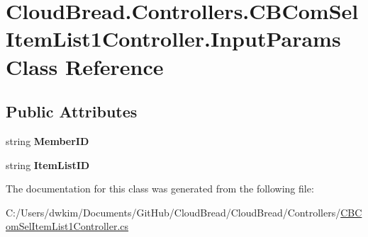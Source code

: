 \hypertarget{class_cloud_bread_1_1_controllers_1_1_c_b_com_sel_item_list1_controller_1_1_input_params}{}\section{Cloud\+Bread.\+Controllers.\+C\+B\+Com\+Sel\+Item\+List1\+Controller.\+Input\+Params Class Reference}
\label{class_cloud_bread_1_1_controllers_1_1_c_b_com_sel_item_list1_controller_1_1_input_params}
\subsection*{Public Attributes}
\begin{DoxyCompactItemize}
\item 
string {\bfseries Member\+ID}\hypertarget{class_cloud_bread_1_1_controllers_1_1_c_b_com_sel_item_list1_controller_1_1_input_params_a270a6cddccb850cd69129306fc15d9f9}{}\label{class_cloud_bread_1_1_controllers_1_1_c_b_com_sel_item_list1_controller_1_1_input_params_a270a6cddccb850cd69129306fc15d9f9}

\item 
string {\bfseries Item\+List\+ID}\hypertarget{class_cloud_bread_1_1_controllers_1_1_c_b_com_sel_item_list1_controller_1_1_input_params_ab2f3213effe1513033ae6015d9a799a7}{}\label{class_cloud_bread_1_1_controllers_1_1_c_b_com_sel_item_list1_controller_1_1_input_params_ab2f3213effe1513033ae6015d9a799a7}

\end{DoxyCompactItemize}


The documentation for this class was generated from the following file\+:\begin{DoxyCompactItemize}
\item 
C\+:/\+Users/dwkim/\+Documents/\+Git\+Hub/\+Cloud\+Bread/\+Cloud\+Bread/\+Controllers/\hyperlink{_c_b_com_sel_item_list1_controller_8cs}{C\+B\+Com\+Sel\+Item\+List1\+Controller.\+cs}\end{DoxyCompactItemize}
